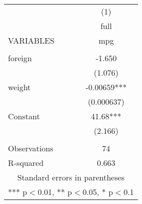 \documentclass[]{article}
\begin{document}
\begin{tabular}{lc} \hline
 & (1) \\
 & full \\
VARIABLES & mpg \\ \hline
 &  \\
foreign & -1.650 \\
 & (1.076) \\
weight & -0.00659*** \\
 & (0.000637) \\
Constant & 41.68*** \\
 & (2.166) \\
 &  \\
Observations & 74 \\
 R-squared & 0.663 \\ \hline
\multicolumn{2}{c}{ Standard errors in parentheses} \\
\multicolumn{2}{c}{ *** p$<$0.01, ** p$<$0.05, * p$<$0.1} \\
\end{tabular}
\end{document}
